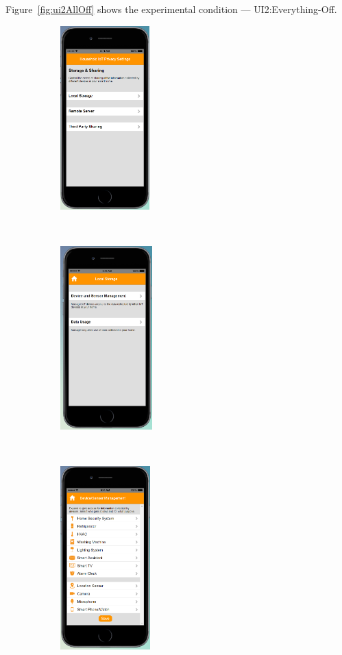 Figure~\ref{fig:ui2AllOff} shows the experimental condition --- UI2:Everything-Off.
\begin{figure}
	\centering
	\begin{subfigure}[t]{0.2\textwidth}
		\centering
		\includegraphics[height=2.8in]{figures/ui2allOff1.png}
	\end{subfigure}%
	~~~~~
	\begin{subfigure}[t]{0.2\textwidth}
	\centering
	\includegraphics[height=2.8in]{figures/ui2allOffLocal.png}
	\end{subfigure}%
	~~~~~
	\begin{subfigure}[t]{0.2\textwidth}
		\centering
		\includegraphics[height=2.8in]{figures/ui2allOff2.png}

\end{subfigure}
\end{figure}

